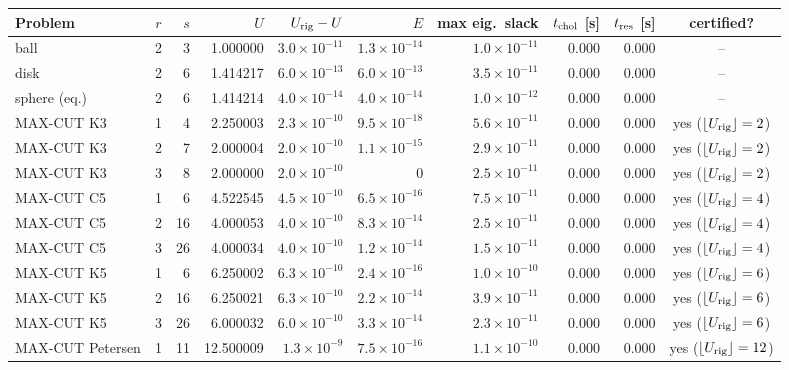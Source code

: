 \begin{tabular}{l c r r r r r r r c}\toprule
Problem & $r$ & $s$ & $U$ & $U_{\rm rig}-U$ & $E$ & max eig.\ slack & $t_{\rm chol}$ [s] & $t_{\rm res}$ [s] & certified? \\\midrule
ball & 2 & 3 & 1.000000 & $3.0\times10^{-11}$ & $1.3\times10^{-14}$ & $1.0\times10^{-11}$ & 0.000 & 0.000 & -- \\
disk & 2 & 6 & 1.414217 & $6.0\times10^{-13}$ & $6.0\times10^{-13}$ & $3.5\times10^{-11}$ & 0.000 & 0.000 & -- \\
sphere (eq.) & 2 & 6 & 1.414214 & $4.0\times10^{-14}$ & $4.0\times10^{-14}$ & $1.0\times10^{-12}$ & 0.000 & 0.000 & -- \\
MAX-CUT K3 & 1 & 4 & 2.250003 & $2.3\times10^{-10}$ & $9.5\times10^{-18}$ & $5.6\times10^{-11}$ & 0.000 & 0.000 & yes ($\lfloor U_{\rm rig}\rfloor=2$) \\
MAX-CUT K3 & 2 & 7 & 2.000004 & $2.0\times10^{-10}$ & $1.1\times10^{-15}$ & $2.9\times10^{-11}$ & 0.000 & 0.000 & yes ($\lfloor U_{\rm rig}\rfloor=2$) \\
MAX-CUT K3 & 3 & 8 & 2.000000 & $2.0\times10^{-10}$ & 0 & $2.5\times10^{-11}$ & 0.000 & 0.000 & yes ($\lfloor U_{\rm rig}\rfloor=2$) \\
MAX-CUT C5 & 1 & 6 & 4.522545 & $4.5\times10^{-10}$ & $6.5\times10^{-16}$ & $7.5\times10^{-11}$ & 0.000 & 0.000 & yes ($\lfloor U_{\rm rig}\rfloor=4$) \\
MAX-CUT C5 & 2 & 16 & 4.000053 & $4.0\times10^{-10}$ & $8.3\times10^{-14}$ & $2.5\times10^{-11}$ & 0.000 & 0.000 & yes ($\lfloor U_{\rm rig}\rfloor=4$) \\
MAX-CUT C5 & 3 & 26 & 4.000034 & $4.0\times10^{-10}$ & $1.2\times10^{-14}$ & $1.5\times10^{-11}$ & 0.000 & 0.000 & yes ($\lfloor U_{\rm rig}\rfloor=4$) \\
MAX-CUT K5 & 1 & 6 & 6.250002 & $6.3\times10^{-10}$ & $2.4\times10^{-16}$ & $1.0\times10^{-10}$ & 0.000 & 0.000 & yes ($\lfloor U_{\rm rig}\rfloor=6$) \\
MAX-CUT K5 & 2 & 16 & 6.250021 & $6.3\times10^{-10}$ & $2.2\times10^{-14}$ & $3.9\times10^{-11}$ & 0.000 & 0.000 & yes ($\lfloor U_{\rm rig}\rfloor=6$) \\
MAX-CUT K5 & 3 & 26 & 6.000032 & $6.0\times10^{-10}$ & $3.3\times10^{-14}$ & $2.3\times10^{-11}$ & 0.000 & 0.000 & yes ($\lfloor U_{\rm rig}\rfloor=6$) \\
MAX-CUT Petersen & 1 & 11 & 12.500009 & $1.3\times10^{-9}$ & $7.5\times10^{-16}$ & $1.1\times10^{-10}$ & 0.000 & 0.000 & yes ($\lfloor U_{\rm rig}\rfloor=12$) \\

\end{tabular}
